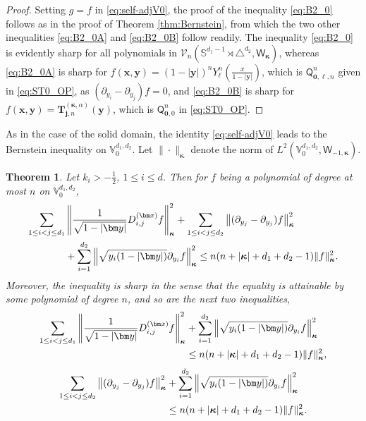 \documentclass{amsart}
\newtheorem{thm}{Theorem}[section]
\theoremstyle{remark}
\def\sQ{{\mathsf Q}}
\def\sW{{\mathsf W}}
\def\l{{\lambda}}
\def\CV{{\mathcal V}}
\def\SS{{\mathbb S}}
\def\VV{{\mathbb V}}
\def\bk{{\boldsymbol{\kappa}}}
\def\f{\frac}
\begin{document}
\begin{proof}
Setting $g = f$ in \eqref{eq:self-adjV0}, the proof of the inequality \eqref{eq:B2_0} follows as in the proof 
of Theorem \ref{thm:Bernstein}, from which the two other inequalities \eqref{eq:B2_0A} and \eqref{eq:B2_0B}
follow readily. The inequality \eqref{eq:B2_0} is evidently sharp for all polynomials in 
$\CV_n(\SS^{d_1-1} \!\rtimes \triangle^{d_2}, \sW_\bk)$, 
whereas \eqref{eq:B2_0A} is sharp for $f(\bm x, \bm y) =  (1-|\bm y|)^n Y_\ell^n(\frac{x}{1-|\bm y|})$, which 
is $\sQ_{\bm 0, \ell, n}^n$ given in \eqref{eq:ST0_OP}, as $(\partial_{y_i} - \partial_{y_j}) f =0$, and \eqref{eq:B2_0B} 
is sharp for $f(\bm x, \bm y) = \bm T_{\bm j, n}^{(\bk, \alpha)}(\bm y)$, which is $\sQ_{\bm 0, 0}^n$ in \eqref{eq:ST0_OP}.
\end{proof}


\iffalse
As in the case of the solid domain, the identity \eqref{eq:self-adjV0} leads to the Bernstein inequality on $\VV_0^{d_1,d_2}$. 
Let $\|\cdot \|_\bk$ denote the norm of $L^2(\VV_0^{d_1,d_2}, \sW_{-1,\bk})$. 

\begin{thm} 
Let $k_i > -\f12$, $1 \le i \le d$. Then for $f$ being a polynomial of degree at most $n$ on $\VV_0^{d_1,d_2}$, 
\begin{align}\label{eq:B2_0}
 \sum_{1 \le i< j \le d_1} & \left \| \frac{1}{\sqrt{1-|\bm y|}}  D_{i,j}^{(\bm x)} f \right \|_{\bk}^2   + 
  \sum_{1\le i< j \le d_2} \left\| (\partial_{y_j} - \partial_{y_j}) f \right\|_{\bk} ^2 \\
    & + 
   \sum_{i=1}^{d_2} \left \| \sqrt{y_i  (1-|\bm y|)}  \partial_{y_i} f\right\|_{\bk} ^2 
   \le   n(n+ |\bk| + d_1 + d_2-1)\|f\|_{\bk}^2. \notag
\end{align}
Moreover, the inequality is sharp in the sense that the equality is attainable by some polynomial of degree $n$, and 
so are the next two inequalities,
\begin{align}\label{eq:B2_0A}
 \sum_{1 \le i< j \le d_1}  \left \| \frac{1}{\sqrt{1-|\bm y|}}  D_{i,j}^{(\bm x)} f \right \|_{\bk}^2   
    & +   \sum_{i=1}^{d_2} \left \| \sqrt{y_i  (1-|\bm y|)}  \partial_{y_i} f\right\|_{\bk} ^2 \\
    & \le   n(n+ |\bk| + d_1 + d_2-1)\|f\|_{\bk}^2, \notag
\end{align}
\begin{align}\label{eq:B2_0B}
  \sum_{1\le i< j \le d_2} \left\| (\partial_{y_j} - \partial_{y_j}) f \right\|_{\bk} ^2 & + 
   \sum_{i=1}^{d_2} \left \| \sqrt{y_i  (1-|\bm y|)}  \partial_{y_i} f\right\|_{\bk} ^2 \\
  & \le   n(n+ |\bk| + d_1 + d_2-1)\|f\|_{\bk}^2. \notag
\end{align}
\end{thm}
\end{document}

